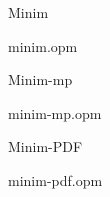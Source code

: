 \load[doc]
\def\eTeX{$\varepsilon$-\TeX}

\sec Minim

\printdoc minim.opm

\sec Minim-mp

\printdoc minim-mp.opm

\sec Minim-PDF

\printdoc minim-pdf.opm

\bye
